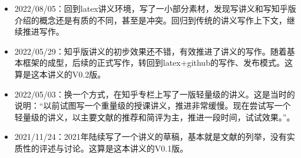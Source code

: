 \documentclass[UTF8]{ctexrep}
\begin{document}
\renewcommand{\labelitemi}{\Writinghand}
%
\begin{itemize}
    \item 2022/08/05：回到latex讲义环境，写了一小部分素材，发现写讲义和写知乎版介绍的概念还是有质的不同，甚至是冲突。回归到传统的讲义写作上下文，继续推进写作。

    \item 2022/05/29：知乎版讲义的初步效果还不错，有效推进了讲义的写作。随着基本框架的成型，后续的正式写作，转回到latex+github的写作、发布模式。这算是这本讲义的V0.2版。
    
    \item 2022/05/03：换一个方式，在知乎专栏上写了一版轻量级的讲义。这是当时的说明：“以前试图写一个重量级的授课讲义，推进非常缓慢。现在尝试写一个轻量级的讲义，以主要文献的推荐和简评为主，推进一段时间，试试效果。”。
    
    \item 2021/11/24：2021年陆续写了一个讲义的草稿，基本就是文献的列举，没有实质性的评述与讨论。这算是这本讲义的V0.1版。
\end{itemize}








%



\end{document}
